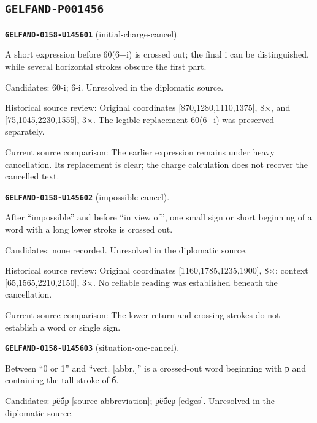 \subsection*{\texttt{GELFAND-P001456}}
\par\noindent\leavevmode{}\label{GELFAND-0158-U145601}\label{GELFAND-P001456:initial-charge-cancel}\textbf{\texttt{GELFAND-0158-U145601}} (initial-charge-cancel).\nopagebreak[4]\par
A short expression before 60(6−i) is crossed out; the final i can be distinguished, while several horizontal strokes obscure the first part.\par
Candidates: 60-i; 6-i. Unresolved in the diplomatic source.\par
Historical source review: Original coordinates [870,1280,1110,1375], 8×, and [75,1045,2230,1555], 3×. The legible replacement 60(6−i) was preserved separately.\par
Current source comparison: The earlier expression remains under heavy cancellation. Its replacement is clear; the charge calculation does not recover the cancelled text.\par\medskip
\par\noindent\leavevmode{}\label{GELFAND-0158-U145602}\label{GELFAND-P001456:impossible-cancel}\textbf{\texttt{GELFAND-0158-U145602}} (impossible-cancel).\nopagebreak[4]\par
After “impossible” and before “in view of”, one small sign or short beginning of a word with a long lower stroke is crossed out.\par
Candidates: none recorded. Unresolved in the diplomatic source.\par
Historical source review: Original coordinates [1160,1785,1235,1900], 8×; context [65,1565,2210,2150], 3×. No reliable reading was established beneath the cancellation.\par
Current source comparison: The lower return and crossing strokes do not establish a word or single sign.\par\medskip
\par\noindent\leavevmode{}\label{GELFAND-0158-U145603}\label{GELFAND-P001456:situation-one-cancel}\textbf{\texttt{GELFAND-0158-U145603}} (situation-one-cancel).\nopagebreak[4]\par
Between “0 or 1” and “vert. [abbr.]” is a crossed-out word beginning with р and containing the tall stroke of б.\par
Candidates: рёбр [source abbreviation]; рёбер [edges]. Unresolved in the diplomatic source.\par

